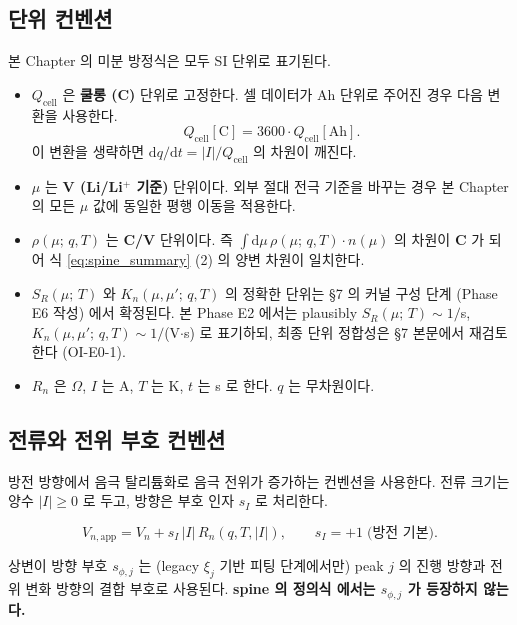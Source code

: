 \documentclass[11pt,a4paper]{article}
\newcommand{\dd}{\mathrm{d}}
\newcommand{\app}{\mathrm{app}}
\newcommand{\cell}{\mathrm{cell}}
\newcommand{\Ah}{\mathrm{Ah}}
\newcommand{\Cunit}{\mathrm{C}}
\newcommand{\mucont}{\mu}
\newcommand{\rhomu}{\rho(\mucont;\, q, T)}
\newcommand{\Sreact}{S_R(\mucont;\, T)}
\newcommand{\Kncross}{K_n(\mucont, \mucont';\, q, T)}
\newcommand{\nmu}{n(\mucont)}
\begin{document}
\subsection{단위 컨벤션}

본 Chapter 의 미분 방정식은 모두 SI 단위로 표기된다.

\begin{itemize}
\item $Q_{\cell}$ 은 \textbf{쿨롱 (C)} 단위로 고정한다. 셀 데이터가 Ah 단위로
      주어진 경우 다음 변환을 사용한다.
      \begin{equation}
      Q_{\cell}[\Cunit] = 3600 \cdot Q_{\cell}[\Ah].
      \label{eq:ah_to_c}
      \end{equation}
      이 변환을 생략하면 $\dd q/\dd t = |I|/Q_{\cell}$ 의 차원이 깨진다.
\item $\mucont$ 는 \textbf{V (Li/Li$^+$ 기준)} 단위이다. 외부 절대 전극 기준을
      바꾸는 경우 본 Chapter 의 모든 $\mucont$ 값에 동일한 평행 이동을 적용한다.
\item $\rhomu$ 는 \textbf{C/V} 단위이다. 즉
      $\int \dd\mucont\, \rhomu \cdot \nmu$ 의 차원이 \textbf{C} 가 되어 식
      \eqref{eq:spine_summary} (2) 의 양변 차원이 일치한다.
\item $\Sreact$ 와 $\Kncross$ 의 정확한 단위는 \S 7 의 커널 구성 단계 (Phase
      E6 작성) 에서 확정된다. 본 Phase E2 에서는 plausibly $\Sreact \sim 1/$s,
      $\Kncross \sim 1/$(V$\cdot$s) 로 표기하되, 최종 단위 정합성은 \S 7 본문에서
      재검토한다 (OI-E0-1).
\item $R_n$ 은 $\Omega$, $I$ 는 A, $T$ 는 K, $t$ 는 s 로 한다. $q$ 는 무차원이다.
\end{itemize}

\subsection{전류와 전위 부호 컨벤션}

방전 방향에서 음극 탈리튬화로 음극 전위가 증가하는 컨벤션을 사용한다. 전류 크기는
양수 $|I| \ge 0$ 로 두고, 방향은 부호 인자 $s_I$ 로 처리한다.

\begin{equation}
V_{n,\app} = V_n + s_I\, |I|\, R_n(q, T, |I|),
\qquad s_I = +1 \;\text{(방전 기본)}.
\label{eq:Vapp_def}
\end{equation}

상변이 방향 부호 $s_{\phi,j}$ 는 (legacy $\xi_j$ 기반 피팅 단계에서만) peak $j$
의 진행 방향과 전위 변화 방향의 결합 부호로 사용된다. \textbf{spine 의 정의식
에서는 $s_{\phi,j}$ 가 등장하지 않는다.}
\end{document}
